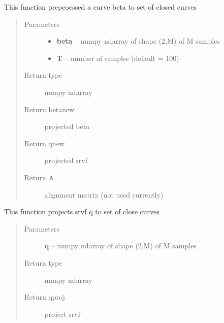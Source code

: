 \documentclass[letterpaper,10pt,english]{sphinxmanual}
\begin{document}
\begin{fulllineitems}
\label{curve_functions:curve_functions.pre_proc_curve}
This function prepcoessed a curve beta to set of closed curves
\begin{quote}\begin{description}
\item[{Parameters}] \leavevmode\begin{itemize}
\item {} 
\textbf{beta} -- numpy ndarray of shape (2,M) of M samples

\item {} 
\textbf{T} -- number of samples (default = 100)

\end{itemize}

\item[{Return type}] \leavevmode
numpy ndarray

\item[{Return betanew}] \leavevmode
projected beta

\item[{Return qnew}] \leavevmode
projected srvf

\item[{Return A}] \leavevmode
alignment matrix (not used currently)

\end{description}\end{quote}

\end{fulllineitems}


\begin{fulllineitems}
\label{curve_functions:curve_functions.project_curve}
This function projects srvf q to set of close curves
\begin{quote}\begin{description}
\item[{Parameters}] \leavevmode
\textbf{q} -- numpy ndarray of shape (2,M) of M samples

\item[{Return type}] \leavevmode
numpy ndarray

\item[{Return qproj}] \leavevmode
project srvf

\end{description}\end{quote}

\end{fulllineitems}
\end{document}
